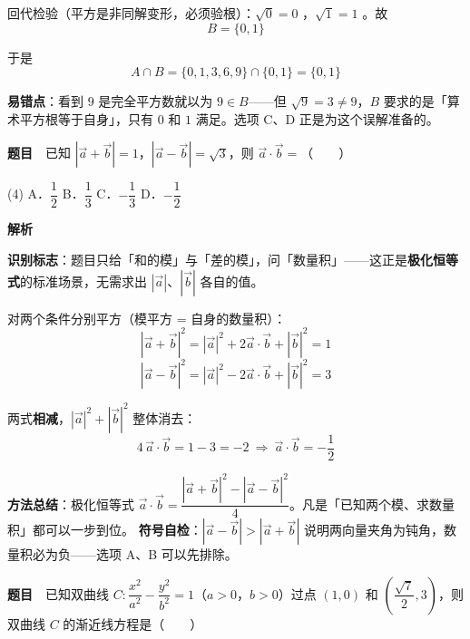 回代检验（平方是非同解变形，必须验根）：$\sqrt{0}=0$ ，$\sqrt{1}=1$ 。故
\[B=\{0,1\}\]

于是
\[A\cap B=\{0,1,3,6,9\}\cap\{0,1\}=\{0,1\}\]


\begin{gktip}
\textbf{易错点}：看到 $9$ 是完全平方数就以为 $9\in B$——但 $\sqrt{9}=3\ne9$，$B$ 要求的是「算术平方根等于自身」，只有 $0$ 和 $1$ 满足。选项 C、D 正是为这个误解准备的。
\end{gktip}

\par\medskip


\textbf{题目}　已知 $\left|\vec{a}+\vec{b}\right|=1$，$\left|\vec{a}-\vec{b}\right|=\sqrt{3}$，则 $\vec{a}\cdot\vec{b}=$（　　）

\begin{gkopts}(4)
\task A．$\dfrac{1}{2}$
\task B．$\dfrac{1}{3}$
\task C．$-\dfrac{1}{3}$
\task D．$-\dfrac{1}{2}$
\end{gkopts}

\textbf{解析}

\textbf{识别标志}：题目只给「和的模」与「差的模」，问「数量积」——这正是\textbf{极化恒等式}的标准场景，无需求出 $\left|\vec a\right|$、$\left|\vec b\right|$ 各自的值。

对两个条件分别平方（模平方 = 自身的数量积）：
\[\left|\vec a+\vec b\right|^2=\left|\vec a\right|^2+2\vec a\cdot\vec b+\left|\vec b\right|^2=1\]
\[\left|\vec a-\vec b\right|^2=\left|\vec a\right|^2-2\vec a\cdot\vec b+\left|\vec b\right|^2=3\]

两式\textbf{相减}，$\left|\vec a\right|^2+\left|\vec b\right|^2$ 整体消去：
\[4\,\vec a\cdot\vec b=1-3=-2\ \Longrightarrow\ \vec a\cdot\vec b=-\frac12\]


\begin{gktip}
\textbf{方法总结}：极化恒等式 $\vec a\cdot\vec b=\dfrac{\left|\vec a+\vec b\right|^2-\left|\vec a-\vec b\right|^2}{4}$。凡是「已知两个模、求数量积」都可以一步到位。
\textbf{符号自检}：$\left|\vec a-\vec b\right|>\left|\vec a+\vec b\right|$ 说明两向量夹角为钝角，数量积必为负——选项 A、B 可以先排除。
\end{gktip}

\par\medskip


\textbf{题目}　已知双曲线 $C:\dfrac{x^2}{a^2}-\dfrac{y^2}{b^2}=1$（$a>0$，$b>0$）过点 $(1,0)$ 和 $\left(\dfrac{\sqrt{7}}{2},3\right)$，则双曲线 $C$ 的渐近线方程是（　　）

